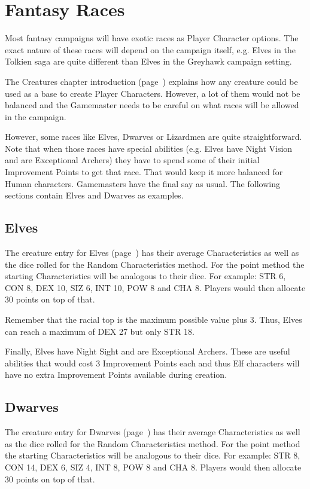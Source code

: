 

\section{Fantasy Races}
Most fantasy campaigns will have exotic races as Player Character options. The exact nature of these races will depend on the campaign itself, e.g. Elves in the Tolkien saga are quite different than Elves in the Greyhawk campaign setting.

The Creatures chapter introduction (page~\pageref{ch:creatures}) explains how any creature could be used as a base to create Player Characters. However, a lot of them would not be balanced and the Gamemaster needs to be careful on what races will be allowed in the campaign.

However, some races like Elves, Dwarves or Lizardmen are quite straightforward. Note that when those races have special abilities (e.g. Elves have Night Vision and are Exceptional Archers) they have to spend some of their initial Improvement Points to get that race. That would keep it more balanced for Human characters. Gamemasters have the final say as usual. The following sections contain Elves and Dwarves as examples. 

\subsection{Elves}
The creature entry for Elves (page~\pageref{creature:elf}) has their average Characteristics as well as the dice rolled for the Random Characteristics method. For the point method the starting Characteristics will be analogous to their dice. For example: STR 6, CON 8, DEX 10, SIZ 6, INT 10, POW 8 and CHA 8. Players would then allocate 30 points on top of that.

Remember that the racial top is the maximum possible value plus 3. Thus, Elves can reach a maximum of DEX 27 but only STR 18.

Finally, Elves have Night Sight and are Exceptional Archers. These are useful abilities that would cost 3 Improvement Points each and thus Elf characters will have no extra Improvement Points available during creation.

\subsection{Dwarves}
The creature entry for Dwarves (page~\pageref{creature:dwarf}) has their average Characteristics as well as the dice rolled for the Random Characteristics method. For the point method the starting Characteristics will be analogous to their dice. For example: STR 8, CON 14, DEX 6, SIZ 4, INT 8, POW 8 and CHA 8. Players would then allocate 30 points on top of that.

